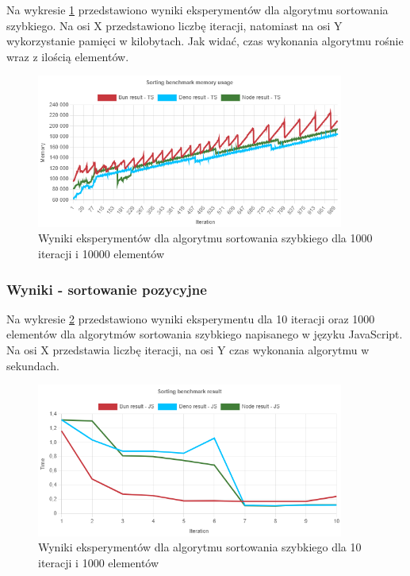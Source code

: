 Na wykresie \ref{fig:quick_sorting_e6_memory_ts} przedstawiono wyniki eksperymentów dla algorytmu sortowania szybkiego. Na osi X przedstawiono liczbę iteracji, natomiast na osi Y wykorzystanie pamięci w kilobytach. Jak widać, czas wykonania algorytmu rośnie wraz z ilością elementów.
\begin{figure}[H]
  \centering
  \includegraphics[width=0.9\textwidth]{Figures/sorting/quick/e6_memory_ts.png}
  \caption{Wyniki eksperymentów dla algorytmu sortowania szybkiego dla 1000 iteracji i 10000 elementów}
  \label{fig:quick_sorting_e6_memory_ts}
\end{figure}

\subsubsection{Wyniki - sortowanie pozycyjne}
Na wykresie \ref{fig:radix_sorting_e1_js} przedstawiono wyniki eksperymentu dla 10 iteracji oraz 1000 elementów dla algorytmów sortowania szybkiego napisanego w języku JavaScript. Na osi X przedstawia liczbę iteracji, na osi Y czas wykonania algorytmu w sekundach. 

\begin{figure}[H]
  \centering
  \includegraphics[width=0.9\textwidth]{Figures/sorting/radix/e1_js.png}
  \caption{Wyniki eksperymentów dla algorytmu sortowania szybkiego dla 10 iteracji i 1000 elementów}
  \label{fig:radix_sorting_e1_js}
\end{figure}

